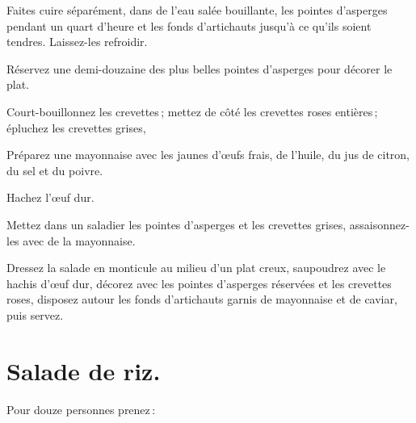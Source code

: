 Faites cuire séparément, dans de l’eau salée bouillante, les pointes d'asperges
pendant un quart d'heure et les fonds d'artichauts jusqu'à ce qu'ils soient
tendres. Laissez-les refroidir.

Réservez une demi-douzaine des plus belles pointes d'asperges pour décorer le
plat.

Court-bouillonnez les crevettes ; mettez de côté les crevettes roses entières ;
épluchez les crevettes grises,

Préparez une mayonnaise avec les jaunes d'œufs frais, de l'huile, du jus de
citron, du sel et du poivre.

Hachez l'œuf dur.

Mettez dans un saladier les pointes d'asperges et les crevettes grises,
assaisonnez-les avec de la mayonnaise.

Dressez la salade en monticule au milieu d'un plat creux, saupoudrez avec le
hachis d'œuf dur, décorez avec les pointes d'asperges réservées et les crevettes
roses, disposez autour les fonds d'artichauts garnis de mayonnaise et de caviar,
puis servez.

\section*{\centering Salade de riz.}
{}

Pour douze personnes prenez :

